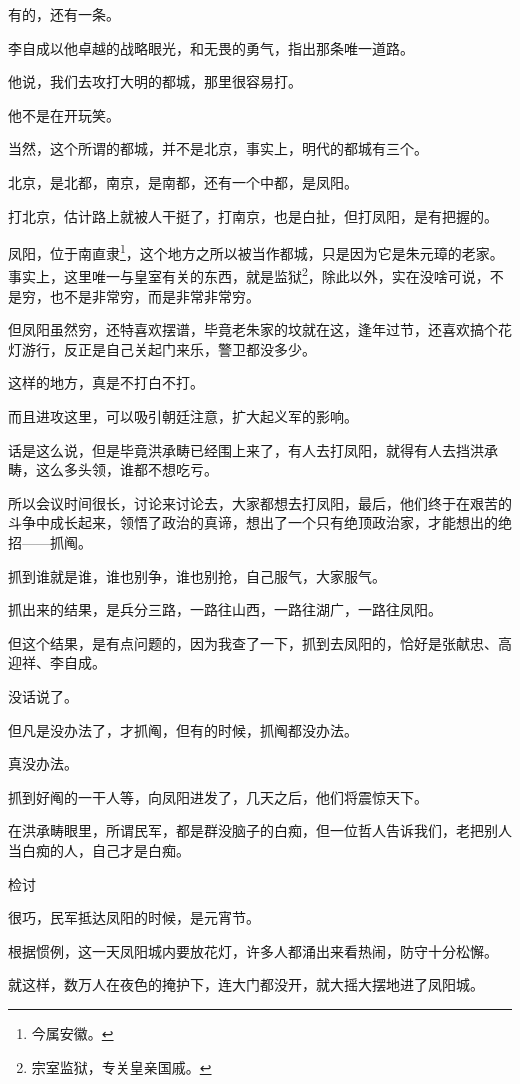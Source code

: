 \begin{multicols}{\theparacolNo}
有的，还有一条。

李自成以他卓越的战略眼光，和无畏的勇气，指出那条唯一道路。

他说，我们去攻打大明的都城，那里很容易打。

他不是在开玩笑。

当然，这个所谓的都城，并不是北京，事实上，明代的都城有三个。

北京，是北都，南京，是南都，还有一个中都，是凤阳。

打北京，估计路上就被人干挺了，打南京，也是白扯，但打凤阳，是有把握的。

凤阳，位于南直隶\footnote{今属安徽。}，这个地方之所以被当作都城，只是因为它是朱元璋的老家。事实上，这里唯一与皇室有关的东西，就是监狱\footnote{宗室监狱，专关皇亲国戚。}，除此以外，实在没啥可说，不是穷，也不是非常穷，而是非常非常穷。

但凤阳虽然穷，还特喜欢摆谱，毕竟老朱家的坟就在这，逢年过节，还喜欢搞个花灯游行，反正是自己关起门来乐，警卫都没多少。

这样的地方，真是不打白不打。

而且进攻这里，可以吸引朝廷注意，扩大起义军的影响。

话是这么说，但是毕竟洪承畴已经围上来了，有人去打凤阳，就得有人去挡洪承畴，这么多头领，谁都不想吃亏。

所以会议时间很长，讨论来讨论去，大家都想去打凤阳，最后，他们终于在艰苦的斗争中成长起来，领悟了政治的真谛，想出了一个只有绝顶政治家，才能想出的绝招——抓阄。

抓到谁就是谁，谁也别争，谁也别抢，自己服气，大家服气。

抓出来的结果，是兵分三路，一路往山西，一路往湖广，一路往凤阳。

但这个结果，是有点问题的，因为我查了一下，抓到去凤阳的，恰好是张献忠、高迎祥、李自成。

没话说了。

但凡是没办法了，才抓阄，但有的时候，抓阄都没办法。

真没办法。

抓到好阄的一干人等，向凤阳进发了，几天之后，他们将震惊天下。

在洪承畴眼里，所谓民军，都是群没脑子的白痴，但一位哲人告诉我们，老把别人当白痴的人，自己才是白痴。

检讨

很巧，民军抵达凤阳的时候，是元宵节。

根据惯例，这一天凤阳城内要放花灯，许多人都涌出来看热闹，防守十分松懈。

就这样，数万人在夜色的掩护下，连大门都没开，就大摇大摆地进了凤阳城。


\end{multicols}
